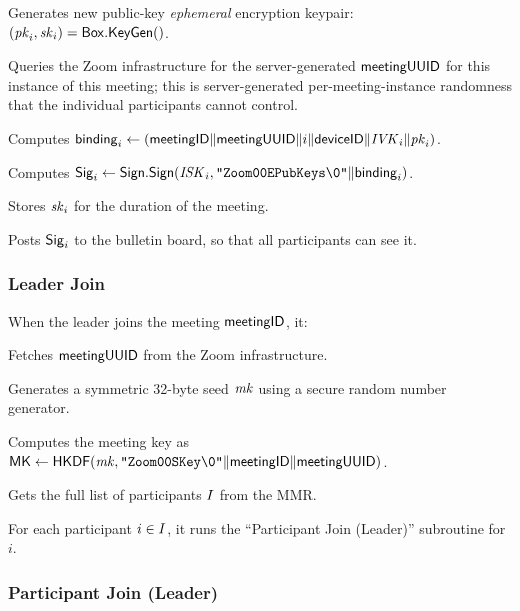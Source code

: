 \begingroup
\RaggedRight
\begin{enumerate*}
\item Generates new public-key \textit{ephemeral} encryption keypair: $(\mathit{pk}_i, \mathit{sk}_i) = {\sf Box}.\mathsf{KeyGen}()$.
\item Queries the Zoom infrastructure for the server-generated ${\sf meetingUUID}$ for this instance of this meeting; this is server-generated per-meeting-instance randomness that the individual participants cannot control.
\item Computes ${\sf binding}_i \leftarrow \left( {\sf meetingID} \| \allowbreak {\sf meetingUUID} \| i \allowbreak \| {\sf deviceID} \| \mathit{IVK}_i \| \allowbreak \mathit{pk}_i \right)$.
\item Computes ${\sf Sig}_i \leftarrow {\sf Sign}.\mathsf{Sign}(\mathit{ISK}_i, \texttt{"Zoom00EPubKeys\textbackslash0"} \| \allowbreak {\sf binding}_i)$.
\item Stores $\mathit{sk}_i$ for the duration of the meeting.
\item Posts ${\sf Sig}_i$ to the bulletin board, so that all participants can see it.
\end{enumerate*}
\endgroup

\subsubsection{Leader Join}

When the leader joins the meeting ${\sf meetingID}$, it:

\begingroup
\RaggedRight
\begin{enumerate*}
\item Fetches ${\sf meetingUUID}$ from the Zoom infrastructure.
\item Generates a symmetric 32-byte seed $\mathit{mk}$ using a secure random number generator.
\item Computes the meeting key as ${\sf MK} \leftarrow {\sf HKDF}(\mathit{mk}, \allowbreak \texttt{"Zoom00SKey\textbackslash0"} \|  \allowbreak {\sf meetingID} \|  \allowbreak {\sf meetingUUID})$.
\item Gets the full list of participants $I$ from the MMR.
\item For each participant $i \in I$, it runs the ``Participant Join (Leader)'' subroutine for $i$.
\end{enumerate*}
\endgroup

\subsubsection{Participant Join (Leader)}

